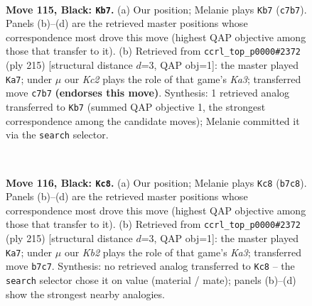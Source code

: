 \documentclass[11pt]{article}
\begin{document}
\begin{figure}[p]\centering
\begin{subfigure}{0.46\textwidth}\centering
\resizebox{\linewidth}{!}{%
\newchessgame
\chessboard[
  setfen={6K1/2k5/8/5p2/b4P2/8/8/8 b - - 45 115},
  showmover=false,
  pgfstyle=straightmove, color=movearrow, markmove={c7-b7}
]}
\caption{}
\end{subfigure}\hfill
\begin{subfigure}{0.46\textwidth}\centering
\resizebox{\linewidth}{!}{%
\newchessgame
\chessboard[
  setfen={8/6b1/k7/8/2K5/p4N2/P7/8 b - - 73 108},
  showmover=false,
  pgfstyle=straightmove, color=movearrow, markmove={a6-a7}
]}
\caption{}
\end{subfigure}
\\[4pt]

\caption{\textbf{Move 115, Black: \texttt{Kb7}.} (a) Our position; Melanie plays \texttt{Kb7} (\texttt{c7b7}). Panels (b)--(d) are the retrieved master positions whose correspondence most drove this move (highest QAP objective among those that transfer to it). (b) Retrieved from \texttt{ccrl\_top\_p0000\#2372} (ply 215) [structural distance $d$=3, QAP obj=1]: the master played \texttt{Ka7}; under $\mu$ our \emph{Kc2} plays the role of that game's \emph{Ka3}; transferred move \texttt{c7b7} \textbf{(endorses this move)}. Synthesis: 1 retrieved analog transferred to \texttt{Kb7} (summed QAP objective 1, the strongest correspondence among the candidate moves); Melanie committed it via the \texttt{search} selector.}
\label{fig:thought-m229}
\end{figure}

\clearpage

\begin{figure}[p]\centering
\begin{subfigure}{0.46\textwidth}\centering
\resizebox{\linewidth}{!}{%
\newchessgame
\chessboard[
  setfen={7K/1k6/8/5p2/b4P2/8/8/8 b - - 47 116},
  showmover=false,
  pgfstyle=straightmove, color=movearrow, markmove={b7-c8}
]}
\caption{}
\end{subfigure}\hfill
\begin{subfigure}{0.46\textwidth}\centering
\resizebox{\linewidth}{!}{%
\newchessgame
\chessboard[
  setfen={8/6b1/k7/8/2K5/p4N2/P7/8 b - - 73 108},
  showmover=false,
  pgfstyle=straightmove, color=movearrow, markmove={a6-a7}
]}
\caption{}
\end{subfigure}
\\[4pt]

\caption{\textbf{Move 116, Black: \texttt{Kc8}.} (a) Our position; Melanie plays \texttt{Kc8} (\texttt{b7c8}). Panels (b)--(d) are the retrieved master positions whose correspondence most drove this move (highest QAP objective among those that transfer to it). (b) Retrieved from \texttt{ccrl\_top\_p0000\#2372} (ply 215) [structural distance $d$=3, QAP obj=1]: the master played \texttt{Ka7}; under $\mu$ our \emph{Kb2} plays the role of that game's \emph{Ka3}; transferred move \texttt{b7c7}. Synthesis: no retrieved analog transferred to \texttt{Kc8} -- the \texttt{search} selector chose it on value (material / mate); panels (b)--(d) show the strongest nearby analogies.}
\label{fig:thought-m231}
\end{figure}
\end{document}

